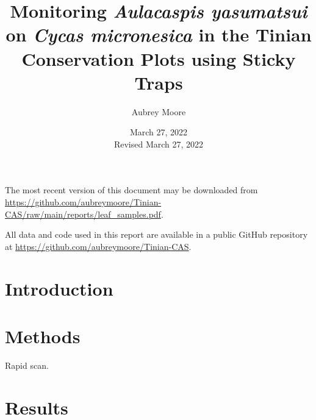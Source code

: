 \documentclass[12pt,letterpaper,english,bibliography=totocnumbered, abstract=on]{scrartcl}
\begin{document}
\titlehead{Technical Report}

\title{Monitoring \textit{Aulacaspis yasumatsui} on \textit{Cycas micronesica} in the Tinian Conservation Plots using Sticky Traps}

\author{Aubrey Moore}

\date{March 27, 2022\\Revised March 27, 2022}

\maketitle
\newpage
\tableofcontents

\pagebreak

The most recent version of this document may be downloaded from \url{https://github.com/aubreymoore/Tinian-CAS/raw/main/reports/leaf_samples.pdf}.

All data and code used in this report are available in a public GitHub repository at
\url{https://github.com/aubreymoore/Tinian-CAS}.

\section{Introduction}

\clearpage
\section{Methods}

Rapid scan.

\clearpage
\section{Results}
\end{document}
